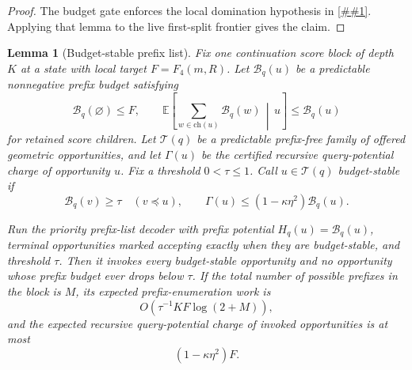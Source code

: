 \documentclass[10pt]{article}
\newcommand{\cref}[1]{\ref{##1}}
\newtheorem{lemma}[theorem]{Lemma}
\theoremstyle{definition}
\newcommand{\E}{\mathbb{E}}
\begin{document}
\begin{proof}
   The budget gate enforces the local domination hypothesis in \cref{lem:bellman-frontier-certificate}. Applying that lemma to the live first-split frontier gives the claim.
\end{proof}

\begin{lemma}[Budget-stable prefix list]\label{lem:budget-stable-prefix-list}
   Fix one continuation score block of depth \(K\) at a state with local target
   \(F=F_4(m,R)\).  Let \(\mathcal B_q(u)\) be a predictable nonnegative
   prefix budget satisfying
   \[
      \mathcal B_q(\varnothing)\le F,
      \qquad
      \E\!\left[\sum_{w\in\mathrm{ch}(u)}\mathcal B_q(w)\,\middle|\,u\right]
      \le \mathcal B_q(u)
   \]
   for retained score children.  Let \(\mathcal T(q)\) be a predictable
   prefix-free family of offered geometric opportunities, and let \(\Gamma(u)\)
   be the certified recursive query-potential charge of opportunity \(u\).
   Fix a threshold \(0<\tau\le1\).  Call \(u\in\mathcal T(q)\)
   budget-stable if
   \[
      \mathcal B_q(v)\ge\tau \quad(v\preceq u),
      \qquad
      \Gamma(u)\le (1-\kappa\eta^2)\mathcal B_q(u).
   \]

   Run the priority prefix-list decoder with prefix potential
   \(H_q(u)=\mathcal B_q(u)\), terminal opportunities marked accepting exactly
   when they are budget-stable, and threshold \(\tau\).  Then it invokes every
   budget-stable opportunity and no opportunity whose prefix budget ever drops
   below \(\tau\).  If the total number of possible prefixes in the block is
   \(M\), its expected prefix-enumeration work is
   \[
      O\!\left(\tau^{-1}KF\log(2+M)\right),
   \]
   and the expected recursive query-potential charge of invoked opportunities
   is at most
   \[
      (1-\kappa\eta^2)F .
   \]
\end{lemma}
\end{document}
